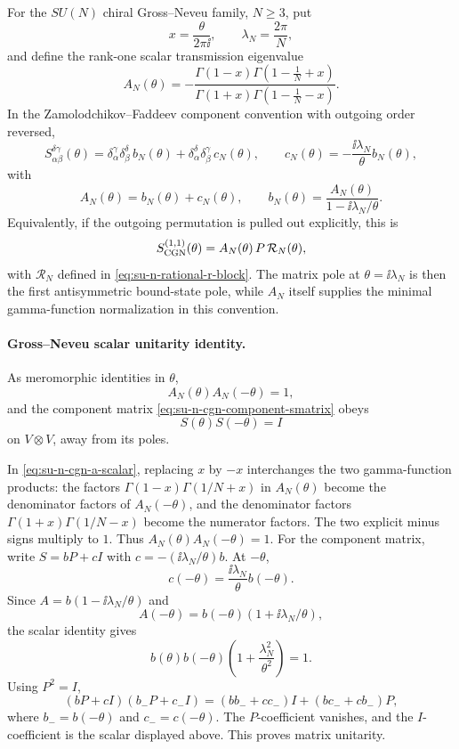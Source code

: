 For the \(SU(N)\) chiral Gross--Neveu family, \(N\ge3\), put
\[
  x=\frac{\theta}{2\pi\ii},\qquad \lambda_N=\frac{2\pi}{N},
\]
and define the rank-one scalar transmission eigenvalue
\begin{equation}
  A_N(\theta)
  =
  -
  \frac{
    \Gamma(1-x)\Gamma(1-\frac1N+x)}
  {
    \Gamma(1+x)\Gamma(1-\frac1N-x)}
  .
  \label{eq:su-n-cgn-a-scalar}
\end{equation}
In the Zamolodchikov--Faddeev component convention with outgoing order
reversed,
\begin{equation}
  S_{\alpha\beta}^{\delta\gamma}(\theta)
  =
  \delta_\alpha^\gamma\delta_\beta^\delta\,b_N(\theta)
  +
  \delta_\alpha^\delta\delta_\beta^\gamma\,c_N(\theta),
  \qquad
  c_N(\theta)=-\frac{\ii\lambda_N}{\theta}b_N(\theta),
  \label{eq:su-n-cgn-component-smatrix}
\end{equation}
with
\[
  A_N(\theta)=b_N(\theta)+c_N(\theta),
  \qquad
  b_N(\theta)=\frac{A_N(\theta)}{1-\ii\lambda_N/\theta}.
\]
Equivalently, if the outgoing permutation is pulled out explicitly, this is
\begin{equation}
  S_{\rm CGN}^{(1,1)}(\theta)
  =
  A_N(\theta)\,P\,\mathcal R_N(\theta),
  \label{eq:chiral-gn-fundamental-smatrix-form}
\end{equation}
with \(\mathcal R_N\) defined in \eqref{eq:su-n-rational-r-block}.  The
matrix pole at \(\theta=\ii\lambda_N\) is then the first
antisymmetric bound-state pole, while \(A_N\) itself supplies the minimal
gamma-function normalization in this convention.

\paragraph{Gross--Neveu scalar unitarity identity.}
As meromorphic identities in \(\theta\),
\[
  A_N(\theta)A_N(-\theta)=1,
\]
and the component matrix \eqref{eq:su-n-cgn-component-smatrix} obeys
\[
  S(\theta)S(-\theta)=I
\]
on \(V\otimes V\), away from its poles.

In \eqref{eq:su-n-cgn-a-scalar}, replacing \(x\) by \(-x\) interchanges the
two gamma-function products:
the factors \(\Gamma(1-x)\Gamma(1/N+x)\) in \(A_N(\theta)\) become the
denominator factors of \(A_N(-\theta)\), and the denominator factors
\(\Gamma(1+x)\Gamma(1/N-x)\) become the numerator factors.  The two explicit
minus signs multiply to \(1\).  Thus \(A_N(\theta)A_N(-\theta)=1\).
For the component matrix, write \(S=bP+cI\) with
\(c=-(\ii\lambda_N/\theta)b\).  At \(-\theta\),
\[
  c(-\theta)=\frac{\ii\lambda_N}{\theta}b(-\theta).
\]
Since \(A=b(1-\ii\lambda_N/\theta)\) and
\[
  A(-\theta)=b(-\theta)(1+\ii\lambda_N/\theta),
\]
the scalar identity gives
\[
  b(\theta)b(-\theta)\left(1+\frac{\lambda_N^2}{\theta^2}\right)=1.
\]
Using \(P^2=I\),
\[
  (bP+cI)(b_-P+c_-I)
  =
  (bb_-+cc_-)I+(bc_-+cb_-)P,
\]
where \(b_-=b(-\theta)\) and \(c_-=c(-\theta)\).  The \(P\)-coefficient
vanishes, and the \(I\)-coefficient is the scalar displayed above.  This
proves matrix unitarity.

